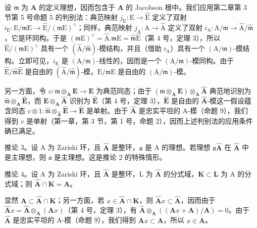 设 \(\mathfrak{m}\) 为 \(\mathbf{A}\) 的定义理想，因而包含于 \(\mathbf{A}\) 的 Jacobson 根中。我们应用第二章第 3 节第 5 号命题 5 的判别法：典范映射 \(j_{\mathrm{E}}: \mathrm{E} \to \hat{\mathrm{E}}\) 定义了双射 \(i_{\mathrm{E}}: \mathrm{E} / \mathfrak{m}\mathrm{E} \to \hat{\mathrm{E}} / (\mathfrak{m}\mathrm{E})^{\wedge}\)；同样，典范映射 \(j_{\mathrm{A}}: \mathrm{A} \to \hat{\mathrm{A}}\) 定义了双射 \(i_{\mathrm{A}}: \mathrm{A} / \mathfrak{m} \to \hat{\mathrm{A}} / \hat{\mathfrak{m}}\)，它是环同构。于是 \((\mathfrak{m}\mathrm{E})^{\wedge} = \hat{\mathrm{A}}. \mathfrak{m}\mathrm{E} = \hat{\mathfrak{m}}\hat{\mathrm{E}}\)（第 4 号，定理 3），所以 \(\hat{\mathrm{E}} / (\mathfrak{m}\mathrm{E})^{\wedge}\) 具有一个 \((\hat{\mathrm{A}} / \hat{\mathfrak{m}})\)-模结构，并且（借助 \(i_{\mathrm{A}}\)）具有一个 \((\mathrm{A} / \mathfrak{m})\)-模结构。立即可见，\(i_{\mathrm{E}}\) 是 \((\mathrm{A} / \mathfrak{m})\)-线性的，因而是一个 \((\mathrm{A} / \mathfrak{m})\)-模同构。由于 \(\hat{\mathrm{E}} / \hat{\mathfrak{m}}\hat{\mathrm{E}}\) 是自由的 \((\hat{\mathrm{A}} / \hat{\mathfrak{m}})\)-模，\(\mathrm{E} / \mathfrak{m}\mathrm{E}\) 是自由的 \((\mathrm{A} / \mathfrak{m})\)-模。

另一方面，令 \(v: \mathfrak{m} \otimes_{\mathbf{A}} \mathbf{E} \to \mathbf{E}\) 为典范同态；由于 \((\mathfrak{m} \otimes_{\mathbf{A}} \mathbf{E}) \otimes_{\mathbf{A}} \hat{\mathbf{A}}\) 典范地识别为 \(\hat{\mathfrak{m}} \otimes_{\mathbf{A}} \hat{\mathbf{E}}\)，而 \(\mathbf{E} \otimes_{\mathbf{A}} \hat{\mathbf{A}}\) 识别为 \(\hat{\mathbf{E}}\)（第 4 号，定理 3），\(\hat{\mathbf{E}}\) 是自由的 \(\hat{\mathbf{A}}\)-模这一假设蕴含同态 \(v \otimes 1: \hat{\mathfrak{m}} \otimes_{\hat{\mathbf{A}}} \hat{\mathbf{E}} \to \hat{\mathbf{E}}\) 是单射。由于 \(\hat{\mathbf{A}}\) 是忠实平坦的 A-模（命题 9），我们得到 \(v\) 是单射（第一章，第 3 节，第 1 号，命题 2），因而上述判别法的应用条件确已满足。

推论 3。设 A 为 Zariski 环，且 \(\hat{\mathbf{A}}\) 是整环，\(\mathfrak{a}\) 是 A 的理想。若理想 \(\mathfrak{a}\hat{\mathbf{A}}\) 在 \(\hat{\mathbf{A}}\) 中是主理想，则 \(\mathfrak{a}\) 是主理想。这是推论 2 的特殊情形。

推论 4。设 A 为 Zariski 环，且 \(\hat{\mathbf{A}}\) 是整环，L 为 \(\hat{\mathbf{A}}\) 的分式域，\(\mathbf{K} \subset \mathbf{L}\) 为 A 的分式域；则 \(\hat{\mathbf{A}} \cap \mathbf{K} = \mathbf{A}\)。

显然 \(\mathbf{A} \subset \hat{\mathbf{A}} \cap \mathbf{K}\)；另一方面，若 \(x \in \hat{\mathbf{A}} \cap \mathbf{K}\)，则 \(\hat{\mathbf{A}}x \subset \hat{\mathbf{A}}\)，因而由于 \(\hat{\mathbf{A}}x = \hat{\mathbf{A}} \otimes_{\mathbf{A}} (\mathbf{A}x)\)（第 4 号，定理 3），有 \(\hat{\mathbf{A}} \otimes_{\mathbf{A}} ((\mathbf{A}x + \mathbf{A}) / \mathbf{A}) = 0\)。由于 \(\hat{\mathbf{A}}\) 是忠实平坦的 A-模（命题 9），我们得到 \(\mathbf{A}x \subset \mathbf{A}\)，所以 \(x \in \mathbf{A}\)。

